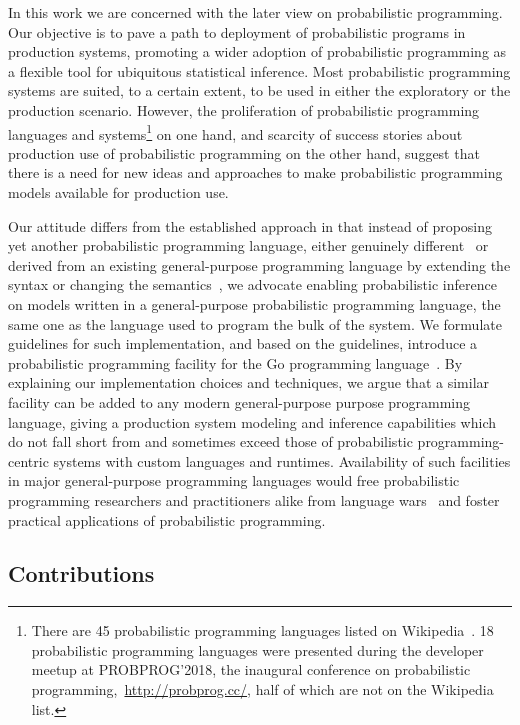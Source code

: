 \documentclass[sigplan,review,10pt,anonymous]{acmart}
\begin{document}
\begin{sloppypar}
	In this work we are concerned with the later view on
	probabilistic programming. Our objective is to pave a path
	to deployment of probabilistic programs in production
	systems, promoting a wider adoption of probabilistic
	programming as a flexible tool for ubiquitous statistical
	inference. Most probabilistic programming systems are
	suited, to a certain extent, to be used in either the
	exploratory or the production scenario. However, the
	proliferation of probabilistic programming languages and
	systems\footnote{There are 45 probabilistic programming
	languages listed on
	Wikipedia~\cite{wiki:Probabilistic_programming_language}. 18
	probabilistic programming languages were presented during
	the developer meetup at PROBPROG'2018, the inaugural
	conference on probabilistic
	programming,~\url{http://probprog.cc/}, half of which are
	not on the Wikipedia list.} on one hand, and scarcity of success
	stories about production use of probabilistic programming on
	the other hand, suggest that there is a need for new ideas
	and approaches to make probabilistic programming models
	available for production use.

	Our attitude differs from the established approach in that
	instead of proposing yet another probabilistic programming
	language, either genuinely different~\cite{MMR+07,Stan17} or
	derived from an existing general-purpose programming
	language by extending the syntax or changing the
	semantics~\cite{GMR+08,TMY+16,GXG18}, we advocate enabling
	probabilistic inference on models written in a
	general-purpose probabilistic programming language, the same
	one as the language used to program the bulk of the system. 
	We formulate guidelines for such implementation, and based
	on the guidelines, introduce a probabilistic programming
	facility for the Go programming language~\cite{Golang}. By
	explaining our implementation choices and techniques,
	we argue that a similar facility can be added to any modern
	general-purpose purpose programming language, giving a
	production system modeling and inference capabilities which
	do not fall short from and sometimes exceed those of
	probabilistic programming-centric systems with custom
	languages and runtimes. Availability of such facilities
	in major general-purpose programming languages would free
	probabilistic programming researchers and practitioners
	alike from language wars~\cite{SH14} and foster practical
	applications of probabilistic programming.

	\subsection*{Contributions}


\end{sloppypar}
\end{document}
